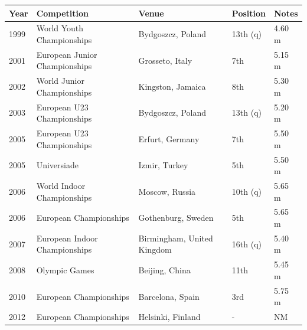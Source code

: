 \documentclass{article}
\begin{document}
\begin{tabular}{lllll}
\toprule
Year & Competition & Venue & Position & Notes \\
\midrule
1999 & World Youth Championships & Bydgoszcz, Poland & 13th (q) & 4.60 m \\
2001 & European Junior Championships & Grosseto, Italy & 7th & 5.15 m \\
2002 & World Junior Championships & Kingston, Jamaica & 8th & 5.30 m \\
2003 & European U23 Championships & Bydgoszcz, Poland & 13th (q) & 5.20 m \\
2005 & European U23 Championships & Erfurt, Germany & 7th & 5.50 m \\
2005 & Universiade & Izmir, Turkey & 5th & 5.50 m \\
2006 & World Indoor Championships & Moscow, Russia & 10th (q) & 5.65 m \\
2006 & European Championships & Gothenburg, Sweden & 5th & 5.65 m \\
2007 & European Indoor Championships & Birmingham, United Kingdom & 16th (q) & 5.40 m \\
2008 & Olympic Games & Beijing, China & 11th & 5.45 m \\
2010 & European Championships & Barcelona, Spain & 3rd & 5.75 m \\
2012 & European Championships & Helsinki, Finland & - & NM \\
\bottomrule
\end{tabular}
\end{document}
